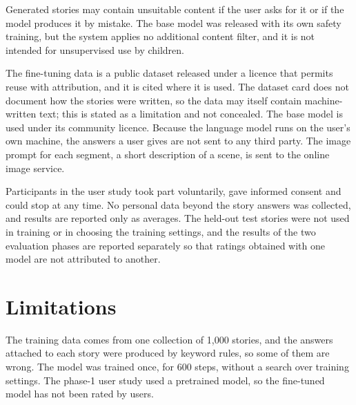Generated stories may contain unsuitable content if the user asks for it or if the model produces it by mistake. The base model was released with its own safety training, but the system applies no additional content filter, and it is not intended for unsupervised use by children.

The fine-tuning data is a public dataset released under a licence that permits reuse with attribution, and it is cited where it is used. The dataset card does not document how the stories were written, so the data may itself contain machine-written text; this is stated as a limitation and not concealed. The base model is used under its community licence. Because the language model runs on the user's own machine, the answers a user gives are not sent to any third party. The image prompt for each segment, a short description of a scene, is sent to the online image service.

Participants in the user study took part voluntarily, gave informed consent and could stop at any time. No personal data beyond the story answers was collected, and results are reported only as averages. The held-out test stories were not used in training or in choosing the training settings, and the results of the two evaluation phases are reported separately so that ratings obtained with one model are not attributed to another.

\section{Limitations}
\label{sec:model-limitations}

The training data comes from one collection of 1,000 stories, and the answers attached to each story were produced by keyword rules, so some of them are wrong. The model was trained once, for 600 steps, without a search over training settings. The phase-1 user study used a pretrained model, so the fine-tuned model has not been rated by users.
